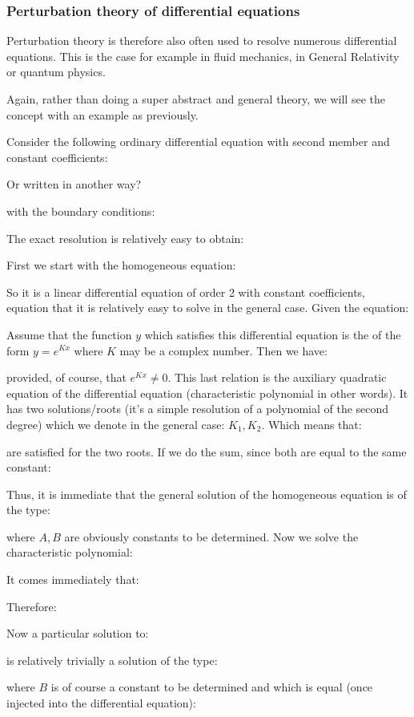 	\pagebreak
	\subsubsection{Perturbation theory of differential equations}
	Perturbation theory is therefore also often used to resolve numerous differential equations. This is the case for example in fluid mechanics, in General Relativity or quantum physics.
	
	Again, rather than doing a super abstract and general theory, we will see the concept with an example as previously.
	
	Consider the following ordinary differential equation with second member and constant coefficients:
	
	Or written in another way?
	
	with the boundary conditions:
	
	The exact resolution is relatively easy to obtain:
	
	First we start with the homogeneous equation:
	
	So it is a linear differential equation of order 2 with constant coefficients, equation that it is relatively easy to solve in the general case. Given the equation:
	
	Assume that the function $y$ which satisfies this differential equation is the of the form $y=e^{Kx}$ where $K$ may be a complex number. Then we have:
	
	provided, of course, that $e^{Kx}\neq 0$. This last relation is the auxiliary quadratic equation of the differential equation (characteristic polynomial in other words). It has two solutions/roots (it's a simple resolution of a polynomial of the second degree) which we denote in the general case: $K_1,K_2$. Which means that:
	
	are satisfied for the two roots. If we do the sum, since both are equal to the same constant:
	
	Thus, it is immediate that the general solution of the homogeneous equation is of the type:
	
	where $A, B$ are obviously constants to be determined. Now we solve the characteristic polynomial:
	
	It comes immediately that:
		
	Therefore:
	
	Now a particular solution to:
	
	is relatively trivially a solution of the type:
	
	where $B$ is of course a constant to be determined and which is equal (once injected into the differential equation):
	

